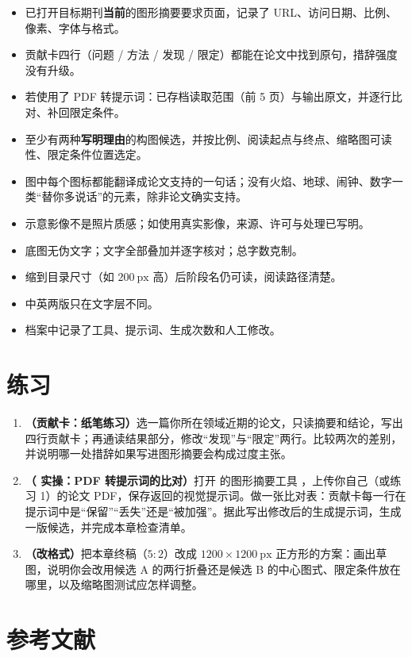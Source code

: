 \begin{itemize}
\item 已打开目标期刊\textbf{当前}的图形摘要要求页面，记录了 URL、访问日期、比例、像素、字体与格式。
\item 贡献卡四行（问题 / 方法 / 发现 / 限定）都能在论文中找到原句，措辞强度没有升级。
\item 若使用了 PDF 转提示词：已存档读取范围（前 5 页）与输出原文，并逐行比对、补回限定条件。
\item 至少有两种\textbf{写明理由}的构图候选，并按比例、阅读起点与终点、缩略图可读性、限定条件位置选定。
\item 图中每个图标都能翻译成论文支持的一句话；没有火焰、地球、闹钟、数字一类“替你多说话”的元素，除非论文确实支持。
\item 示意影像不是照片质感；如使用真实影像，来源、许可与处理已写明。
\item 底图无伪文字；文字全部叠加并逐字核对；总字数克制。
\item 缩到目录尺寸（如 $200\ \text{px}$ 高）后阶段名仍可读，阅读路径清楚。
\item 中英两版只在文字层不同。
\item 档案中记录了工具、提示词、生成次数和人工修改。
\end{itemize}

\section{练习}

\begin{enumerate}
\item \textbf{（贡献卡：纸笔练习）}选一篇你所在领域近期的论文，只读摘要和结论，写出四行贡献卡；再通读结果部分，修改“发现”与“限定”两行。比较两次的差别，并说明哪一处措辞如果写进图形摘要会构成过度主张。
\item \textbf{（\scidraw{} 实操：PDF 转提示词的比对）}打开 \scidraw{} 的图形摘要工具 ，上传你自己（或练习 1）的论文 PDF，保存返回的视觉提示词。做一张比对表：贡献卡每一行在提示词中是“保留”“丢失”还是“被加强”。据此写出修改后的生成提示词，生成一版候选，并完成本章检查清单。
\item \textbf{（改格式）}把本章终稿（$5:2$）改成 $1200 \times 1200\ \text{px}$ 正方形的方案：画出草图，说明你会改用候选 A 的两行折叠还是候选 B 的中心图式、限定条件放在哪里，以及缩略图测试应怎样调整。
\end{enumerate}

\section*{参考文献}

